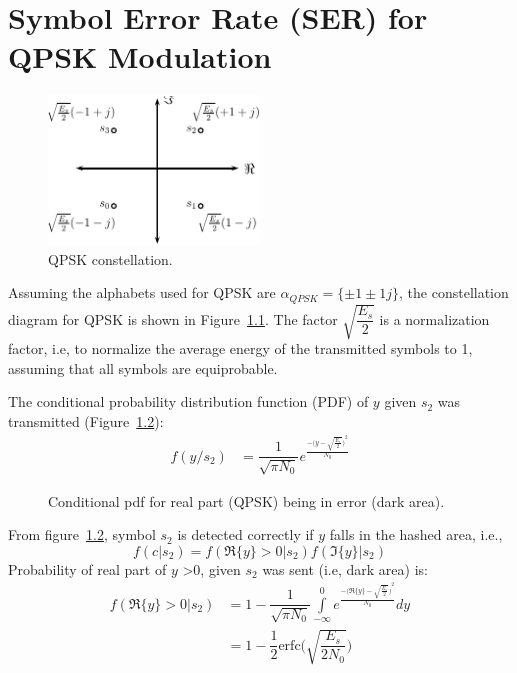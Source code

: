 \chapter{Symbol Error Rate (SER) for QPSK Modulation}\label{appendB}


\begin{figure}[!h]
\centering
\includegraphics[width=0.5\textwidth]{./append2/QPSK_const}
\caption{QPSK constellation.}
\label{figII:QPSK_const}
\end{figure}

\noindent Assuming the alphabets used for QPSK are $ \alpha_{QPSK}=\{\pm 1 \pm 1j\} $, the constellation diagram for QPSK is shown in Figure~\ref{figII:QPSK_const}. 
The factor $ \sqrt{\dfrac{E_s}{2}} $ is a normalization factor, i.e, to normalize the average energy of the transmitted symbols to 1, assuming that all symbols are equiprobable. 




	The conditional probability distribution function (PDF) of $ y $ given $ s_2 $ was transmitted (Figure~\ref{figII:Rpdf}):
	\begin{align}
	f(y/s_2)&=\dfrac{1}{\sqrt{\pi N_0}}e^{\frac{{-\big ( y-\sqrt{\frac{E_s}{2}}\big )}^2}{N_0}}
	\end{align}
	
	\begin{figure}[htb]
	\centering
	\def\svgwidth{0.5\textwidth}
	
	\caption{Conditional pdf for real part (QPSK) being in error (dark area).}
	\label{figII:Rpdf}
	\end{figure}
	From figure~\ref{figII:Rpdf}, symbol $ s_{2} $ is detected correctly if $ y $ falls in the hashed area, i.e.,
	\begin{equation}
	f(c|s_2)=f(\Re\{y\} > 0|s_2 )f(\Im\{y\} | s_2 )
	\end{equation}
	Probability of real part of $ y $ >$ 0 $, given $ s_2 $ was sent (i.e, dark area) is:
	\begin{align}
	f(\Re\{y\} > 0|s_2 )&=1-\dfrac{1}{\sqrt{\pi N_0}}\int\limits_{-\infty}^{0}e^{\frac{{-\big (\Re \{y\}-\sqrt{\frac{E_s}{2}}\big )}^2}{N_0}}dy\\
	&=1-\dfrac{1}{2}\text{erfc}\Big( \sqrt{\dfrac{E_s}{2N_0}} \Big)
	\end{align}
	
